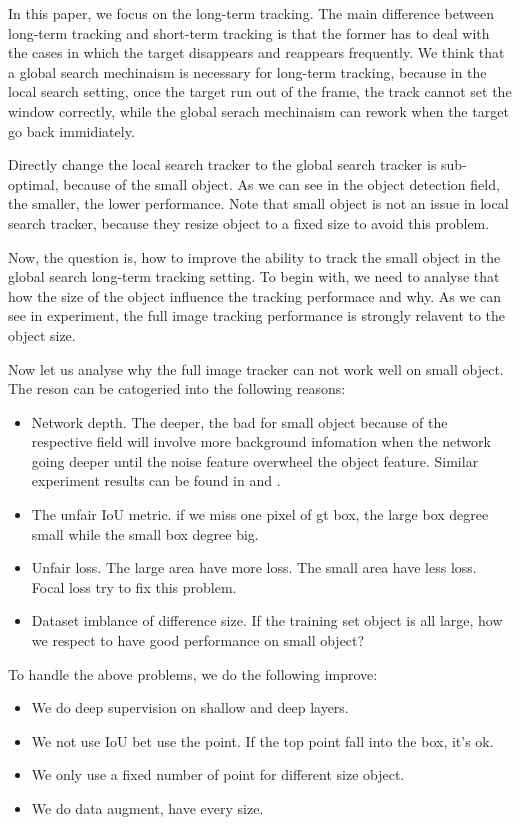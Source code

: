 \documentclass[11pt,a4paper]{article}
\begin{document}
In this paper, we focus on the long-term tracking.
The main difference between long-term tracking and short-term tracking is that the former has to deal with the cases in which the target disappears and reappears frequently. We think that a global search mechinaism is necessary \cite{zhang2021distractor} for long-term tracking, because in the local search setting, once the target run out of the frame, the track cannot set the window correctly, while the global serach mechinaism can rework when the target go back immidiately.

Directly change the local search tracker to the global search tracker is sub-optimal, because of the small object.
As we can see in the object detection field, the smaller, the lower performance. Note that small object is not an issue in local search tracker, because they resize object to a fixed size to avoid this problem.

Now, the question is, how to improve the ability to track the small object in the global search long-term tracking setting. To begin with, we need to analyse that how the size of the object influence the tracking performace and why. As we can see in experiment, the full image tracking performance is strongly relavent to the object size.

Now let us analyse why the full image tracker can not work well on small object. The reson can be catogeried into the following reasons:
\begin{itemize}
    \item Network depth. The deeper, the bad for small object because of the respective field will involve more background infomation when the network going deeper until the noise feature overwheel the object feature. Similar experiment results can be found in \cite{zhang2021distractor} and \cite{SiamDW_2019_CVPR}.
    \item The unfair IoU metric. if we miss one pixel of gt box, the large box degree small while the small box degree big.
    \item Unfair loss. The large area have more loss. The small area have less loss. Focal loss try to fix this problem. 
    \item Dataset imblance of difference size. If the training set object is all large, how we respect to have good performance on small object?
\end{itemize}
To handle the above problems, we do the following improve:
\begin{itemize}
    \item We do deep supervision on shallow and deep layers.
    \item We not use IoU bet use the point. If the top point fall into the box, it's ok.
    \item We only use a fixed number of point for different size object.
    \item We do data augment, have every size.
\end{itemize}
\end{document}
